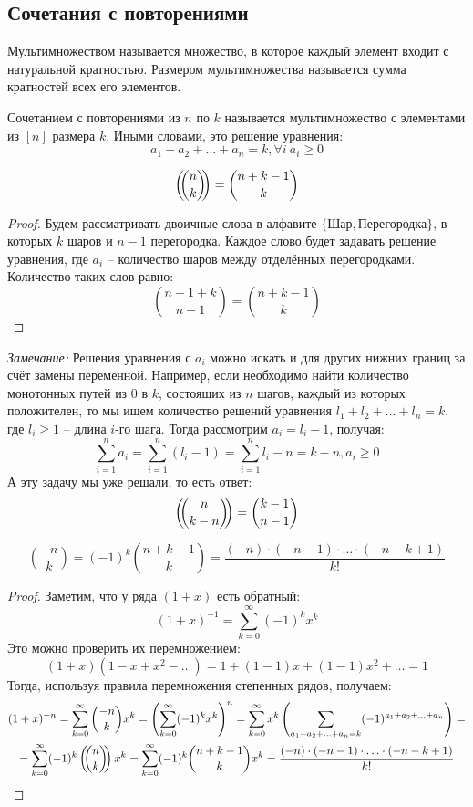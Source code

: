 \documentclass[12pt]{article}
\begin{document}
\subsection{Сочетания с повторениями}

\begin{definition}
	Мультимножеством называется множество, в которое каждый элемент
	входит с натуральной кратностью. Размером мультимножества называется
	сумма кратностей всех его элементов.
\end{definition}
\begin{definition}
	Сочетанием с повторениями из $n$ по $k$ называется мультимножество с
	элементами из $[n]$ размера $k$. Иными словами, это решение уравнения:
	\[a_1+a_2+\ldots+a_n=k, \forall i\ a_i\geq 0\]
\end{definition}
\begin{theorem}
	\[\left(\!\!\binom{n}{k}\!\!\right)=\binom{n+k-1}{k}\]	
	\begin{proof}
		Будем рассматривать двоичные слова в алфавите $\{\texttt{Шар},
		\texttt{Перегородка}\}$, в которых $k$ шаров и $n-1$ перегородка.
		Каждое слово будет задавать решение уравнения, где $a_i$ --
		количество шаров между отделённых перегородками. Количество таких слов равно:
		\[\binom{n-1+k}{n-1}=\binom{n+k-1}{k}\]	
	\end{proof}
	\textit{Замечание:} Решения уравнения с $a_i$ можно искать и для
	других нижних границ за счёт замены переменной. Например, если
	необходимо найти количество монотонных путей из $0$ в $k$, состоящих
	из $n$ шагов, каждый из которых положителен, то мы ищем количество
	решений уравнения $l_1+l_2+\ldots+l_n=k$, где $l_i\geqslant1$ -- длина
	$i$-го шага. Тогда рассмотрим $a_i=l_i-1$, получая:
	\[\sum_{i=1}^{n}a_i=\sum_{i=1}^{n}(l_i-1)=\sum_{i=1}^{n}l_i-n=k-n,
	a_i\geqslant0\]	А эту задачу мы уже решали, то есть ответ:
	\[\left(\!\!\binom{n}{k-n}\!\!\right)=\binom{k-1}{n-1}\]
\end{theorem}
\begin{theorem}
	\[\binom{-n}{k}=(-1)^k\binom{n+k-1}{k}=\frac{(-n)\cdot(-n-1)\cdot\ldots\cdot(-n-k+1)}{k!}\]	
	\begin{proof}
		Заметим, что у ряда $(1+x)$ есть обратный:
		\[(1+x)^{-1}=\sum_{k=0}^{\infty}(-1)^kx^k\]		Это можно проверить их
		перемножением:
		\[(1+x)(1-x+x^2-\ldots)=1+(1-1)x+(1-1)x^2+\ldots=1\]		Тогда,
		используя правила перемножения степенных рядов, получаем:
		\begin{multline*}
			(1+x)^{-n}=\sum_{k=0}^{\infty}\binom{-n}{k}x^k=\left(\sum_{k=0}^{\infty}(-1)^kx^k\right)^n=\sum_{k=0}^{\infty}x^k\left(\sum_{a_1+a_2+\ldots+a_n=k}(-1)^{a_1+a_2+\ldots+a_n}\right)=\\
			=\sum_{k=0}^{\infty}(-1)^k\left(\!\!\binom{n}{k}\!\!\right)x^k=\sum_{k=0}^{\infty}(-1)^k\binom{n+k-1}{k}x^k=\frac{(-n)\cdot(-n-1)\cdot\ldots\cdot(-n-k+1)}{k!}
		\end{multline*}
	\end{proof}
\end{theorem}
\end{document}
